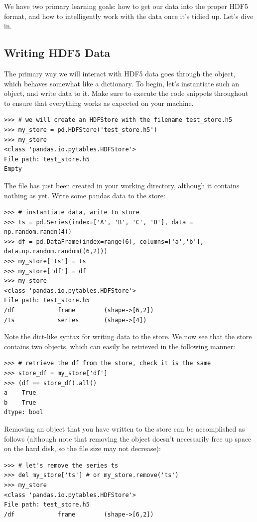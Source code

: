 We have two primary learning goals: how to get our data into the proper HDF5 format, and how to intelligently work with
the data once it's tidied up. Let's dive in.
\subsection*{Writing HDF5 Data}
The primary way we will interact with HDF5 data goes through the  object, which behaves somewhat like a dictionary.
To begin, let's instantiate such an object, and write data to it. Make sure to execute the code snippets throughout to ensure that
everything works as expected on your machine.
\begin{lstlisting}
>>> # we will create an HDFStore with the filename test_store.h5
>>> my_store = pd.HDFStore('test_store.h5')
>>> my_store
<class 'pandas.io.pytables.HDFStore'>
File path: test_store.h5
Empty
\end{lstlisting}
The file  has just been created in your working directory, although it contains nothing as yet.
Write some pandas data to the store:
\begin{lstlisting}
>>> # instantiate data, write to store
>>> ts = pd.Series(index=['A', 'B', 'C', 'D'], data = np.random.randn(4))
>>> df = pd.DataFrame(index=range(6), columns=['a','b'], data=np.random.random((6,2)))
>>> my_store['ts'] = ts
>>> my_store['df'] = df
>>> my_store
<class 'pandas.io.pytables.HDFStore'>
File path: test_store.h5
/df            frame        (shape->[6,2])
/ts            series       (shape->[4]) 
\end{lstlisting}
Note the dict-like syntax for writing data to the store. We now see that the store contains two objects, which
can easily be retrieved in the following manner:
\begin{lstlisting}
>>> # retrieve the df from the store, check it is the same
>>> store_df = my_store['df']
>>> (df == store_df).all()
a    True
b    True
dtype: bool
\end{lstlisting}
Removing an object that you have written to the store can be accomplished as follows (although note that removing the
object doesn't necessarily free up space on the hard disk, so the file size may not decrease):
\begin{lstlisting}
>>> # let's remove the series ts
>>> del my_store['ts'] # or my_store.remove('ts')
>>> my_store
<class 'pandas.io.pytables.HDFStore'>
File path: test_store.h5
/df            frame        (shape->[6,2])
\end{lstlisting}

